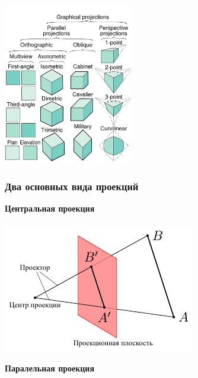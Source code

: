 \documentclass[10pt]{beamer}
\begin{document}
	{
		\centering
		\includegraphics[height=200pt]{Screenshot 2024-02-29 232325.png}
	}
	

    \begin{frame}
    	\frametitle{Два основных вида проекций}
    	
    	{
    		\centering
    		
    		\textbf{Центральная проекция} \\ ~ \\
    		
    		\includegraphics[width=\textwidth]{Images/L3/centralproj.pdf}
    	}
    	{
    		\centering
    		
    		\textbf{Паралельная проекция}  \\ ~ \\
    		
}
\end{frame}
\end{document}
